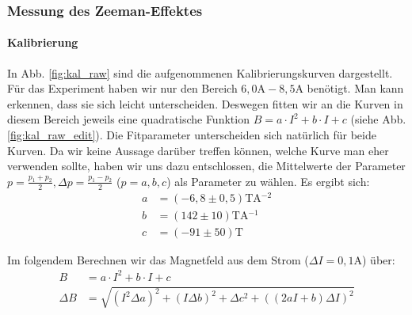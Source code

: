 \subsubsection{Messung des Zeeman-Effektes}
\paragraph{Kalibrierung}
In Abb. \ref{fig:kal_raw} sind die aufgenommenen Kalibrierungskurven dargestellt. Für das Experiment haben wir nur den Bereich $6,0\si{\ampere} - 8,5\si{\ampere}$ benötigt. Man kann erkennen, dass sie sich leicht unterscheiden. Deswegen fitten wir an die Kurven in diesem Bereich jeweils eine quadratische Funktion $B = a\cdot I^2 + b \cdot I + c$ (siehe Abb. \ref{fig:kal_raw_edit}). Die Fitparameter unterscheiden sich natürlich für beide Kurven. Da wir keine Aussage darüber treffen können, welche Kurve man eher verwenden sollte, haben wir uns dazu entschlossen, die Mittelwerte der Parameter $p = \frac{p_1+p_2}{2} , \Delta p = \frac{p_1-p_2}{2}$ ($p = a,b,c$) als Parameter zu wählen. Es ergibt sich: 
\begin{align*}
a &= \si{(-6,8 \pm 0,5)\tesla\ampere^{-2}}\\
b &= \si{(142 \pm 10) \tesla\ampere^{-1}}\\
c &= \si{(-91 \pm 50)\tesla}
\end{align*}

Im folgendem Berechnen wir das Magnetfeld aus dem Strom ($\Delta I = \si{0,1 \ampere}$) über:
\begin{align*}
B &= a\cdot I^2 + b \cdot I + c\\
\Delta B &= \sqrt{(I^2\Delta a)^2 + (I \Delta b)^2 + \Delta c^2 + ((2aI+b)\Delta I)^2}
\end{align*}

